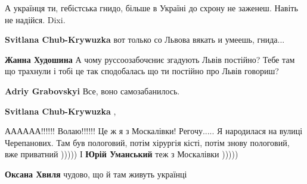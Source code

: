 \begin{itemize}
\begin{itemize}
А українця ти, гебістська гнидо, більше в Україні до схрону не заженеш. Навіть
не надійся. Dixi.


 
\textbf{Svitlana Chub-Krywuzka} вот только со Львова вякать и умеешь, гнида...

 
\textbf{Жанна Худошина} А чому руссоозабочєниє згадують Львів постійно? Тебе
там що трахнули і тобі це так сподобалась що ти постійно про Львів говориш?

 
\textbf{Adriy Grabovskyi} Все, воно самозабанилось.

 
\textbf{Svitlana Chub-Krywuzka} , 

АААААА!!!!!! Волаю!!!!!! Це ж я з Москалівки!
Регочу..... Я народилася на вулиці Черепанових. Там був пологовий, потім
хірургія кісті, потім знову пологовий, вже приватний ))))) І \textbf{Юрій
Уманський} теж з Москалівки )))))

 
\textbf{Оксана Хвиля} чудово, що й там живуть українці \Smiley[1.0][yellow]

 


\end{itemize}
\end{itemize}
